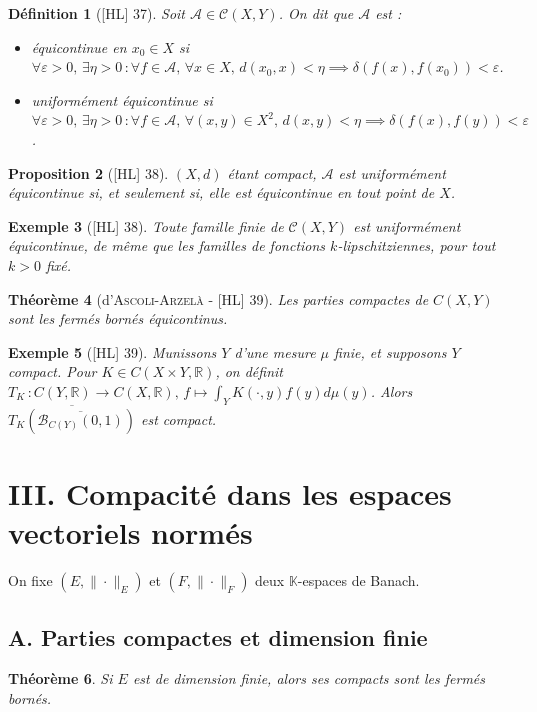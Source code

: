 \documentclass[10pt, a4paper, parskip=full, twoside, twocolumn]{report}
\newtheorem{definition}{Définition}
\newtheorem{theorem}[definition]{Théorème}
\newtheorem{proposition}[definition]{Proposition}
\newtheorem{example}[definition]{Exemple}
\newcommand{\IK}{\mathbb{K}}
\newcommand{\IR}{\mathbb{R}}
\newcommand{\B}{\mathcal{B}}
\newcommand{\A}{\mathscr{A}}
\begin{document}
\begin{definition}[\textnormal{[HL] 37}]
	Soit $\A\in\mathcal{C}(X,Y)$. On dit que $\A$ est :
	\begin{itemize}
		\item \emph{équicontinue en $x_0\in X$} si $\forall \varepsilon >0,\,\exists\eta >0\,\colon \forall f\in\A,\,\forall x\in X,\, d(x_0,x)<\eta\implies\delta(f(x), f(x_0))< \varepsilon$.
		\item \emph{uniformément équicontinue} si $\forall\varepsilon > 0,\,\exists \eta > 0\,\colon \forall f\in \A,\,\forall (x,y)\in X^2,\, d(x,y)< \eta\implies \delta(f(x),f(y))< \varepsilon$.
	\end{itemize}
\end{definition}

\begin{proposition}[\textnormal{[HL] 38}]
	$(X,d)$ étant compact, $\A$ est uniformément équicontinue si, et seulement si, elle est équicontinue en tout point de $X$.
\end{proposition}

\begin{example}[\textnormal{[HL] 38}]
	Toute famille finie de $\mathcal{C}(X,Y)$ est uniformément équicontinue, de même que les familles de fonctions $k$-lipschitziennes, pour tout $k> 0$ fixé.
\end{example}

\begin{theorem}[d'\textsc{Ascoli-Arzelà} - \textnormal{[HL] 39}]
	Les parties compactes de $C(X,Y)$ sont les fermés bornés équicontinus.
\end{theorem}

\begin{example}[\textnormal{[HL] 39}]
	Munissons $Y$ d'une mesure $\mu$ finie, et supposons $Y$ compact.
	Pour $K \in C(X\times Y,\IR)$, on définit $T_K\,\colon C(Y,\IR)\to C(X,\IR),\, f\mapsto \int_Y K(\cdot, y)f(y)d\mu(y)$.
	Alors $\overline{T_K(\overline{\B_{C(Y)}(0,1)})}$ est compact.
\end{example}

\section*{III. Compacité dans les espaces vectoriels normés}
\textcolor{paragraphtext}{On fixe $(E,\|\cdot \|_E)$ et $(F,\|\cdot\|_F)$ deux $\IK$-espaces de Banach.}

\subsection*{A. Parties compactes et dimension finie}
\begin{theorem}
	Si $E$ est de dimension finie, alors ses compacts sont les fermés bornés.
\end{theorem}
\end{document}
